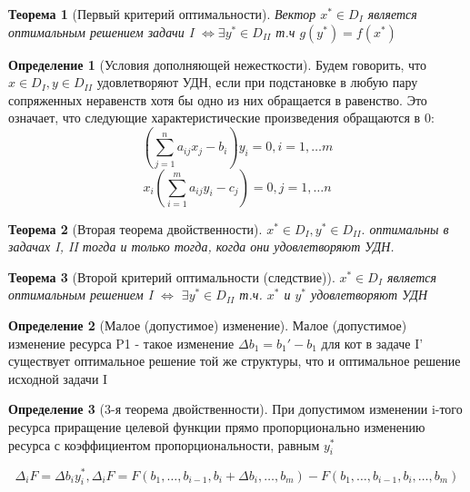 \documentclass[a4paper]{article}
\newtheorem{theorem}{Теорема}[section]
\theoremstyle{definition}
\newtheorem*{definition}{Определение}
\theoremstyle{remark}
\begin{document}
\begin{theorem}[Первый критерий оптимальности]
    Вектор $x^* \in D_I$ является оптимальным решением задачи 
    I $\Leftrightarrow \exists y^* \in D_{II}$ т.ч  $g(y^*) = f(x^*)$    
\end{theorem}
\begin{definition}[Условия дополняющей нежесткости]
    Будем говорить, что $x\in D_I, y \in D_{II}$ удовлетворяют УДН, если при подстановке в любую пару сопряженных неравенств хотя бы одно из них обращается в равенство. Это означает, что следующие характеристические произведения обращаются в 0:
    \[(\sum_{j = 1}^n a_{ij}x_j - b_i)y_i = 0, i  = 1, \dots m\]
    \[x_i (\sum_{i = 1}^m a_{ij}y_i - c_j) = 0, j = 1, \dots n\]
\end{definition}
\begin{theorem}[Вторая теорема двойственности]
    $x^* \in D_I, y^*\in D_{II}.$ оптимальны в задачах I, II тогда и только тогда, когда они удовлетворяют УДН.
\end{theorem}
\begin{theorem}[Второй критерий оптимальности (следствие)]
    \(x^* \in D_I\) является оптимальным решением I \(\Leftrightarrow\)
    \(\exists y^* \in D_{II}\) т.ч. \(x^*\) и \(y^*\) удовлетворяют УДН
\end{theorem}
\begin{definition}[Малое (допустимое) изменение]
    Малое (допустимое) изменение ресурса P1 - такое изменение $\Delta b_1 = b_1' - b_1$ для кот в задаче I' существует оптимальное решение той же структуры, что и оптимальное решение исходной задачи I
\end{definition}
\begin{definition}[3-я теорема двойственности]
    При допустимом изменении i-того ресурса приращение целевой функции прямо пропорционально изменению ресурса с коэффициентом пропорциональности, равным $y_i^*$

    $$\Delta_i F = \Delta b_i y_i^*, \Delta_i F = F(b_1, \dots, b_{i-1}, b_i + \Delta b_i, \dots, b_m)-F(b_1, \dots, b_{i-1}, b_i, \dots, b_m)$$
\end{definition}
\end{document}
